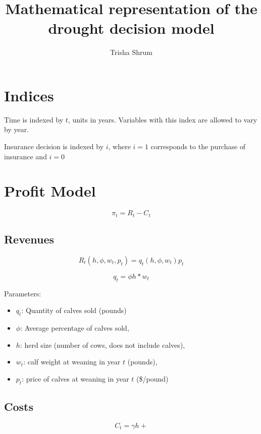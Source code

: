 \documentclass[11pt]{amsart}
\title{Mathematical representation of the drought decision model}
\author{Trisha Shrum}
\begin{document}
\maketitle


\section{Indices}
Time is indexed by $t$, units in years. Variables with this index are allowed to vary by year.

Insurance decision is indexed by $i$, where $i=1$ corresponds to the purchase of insurance and $i=0$


\section{Profit Model}
\begin{equation}
\pi_t = R_t - C_t
\end{equation}

\subsection{Revenues}
\begin{equation}
R_t(h,\phi, w_t, p_t) = q_t (h,\phi, w_t) p_t
\end{equation}

\begin{equation}
q_t = \phi h * w_t
\end{equation}

Parameters:
\begin{itemize}
\item $q_t$: Quantity of calves sold (pounds)
\item \(\phi\): Average percentage of calves sold, 
\item \(h\): herd size (number of cows, does not include calves), 
\item $w_t$: calf weight at weaning in year \(t\) (pounds), 
\item $p_t$: price of calves at weaning in year \(t\) (\$/pound)
\end{itemize}

\subsection{Costs}
\begin{equation}
C_t = \gamma h + 
\end{equation}
\end{document}
